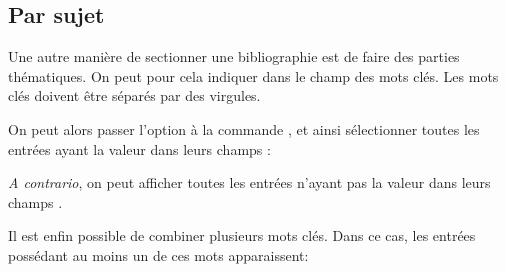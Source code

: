 

\subsection{Par sujet}

Une autre manière de  sectionner une bibliographie est de faire des parties thématiques. On peut pour cela indiquer dans le champ   des mots clés. Les mots clés doivent être séparés par des virgules.

On peut alors passer l'option  à la commande , et ainsi sélectionner toutes les entrées ayant la valeur  dans leurs champs  :

\begin{latexcode}
\printbibliography[keyword=xxx]
\end{latexcode}

\emph{A contrario}, on peut afficher toutes les entrées n'ayant pas la valeur  dans leurs champs .

\begin{latexcode}
\printbibliography[notkeyword=xxx]
\end{latexcode}

Il est enfin possible de combiner plusieurs mots clés. Dans ce cas, les entrées possédant au moins un de ces mots apparaissent:

\begin{latexcode}
\printbibliography[keyword=positivistes, keyword=naturalistes]
\end{latexcode}

